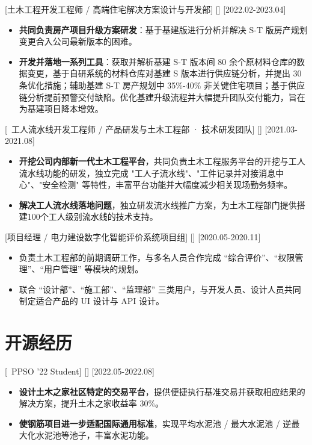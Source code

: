 \documentclass{resume}
\begin{document}
[土木工程开发工程师 / 高端住宅解决方案设计与开发部]
[]
[2022.02-2023.04]
\begin{itemize}
  \item \textbf{共同负责房产项目升级方案研发}：基于基建版进行分析并解决 S-T 版房产规划变更合入公司最新版本的困难。
  \item \textbf{开发并落地一系列工具}：获取并解析基建 S-T 版本间 80 余个原材料仓库的数据变更，基于自研系统的材料仓库对基建 S 版本进行供应链分析，并提出 30 条优化措施；辅助基建 S-T 房产规划中 35\%-40\% 非关键住宅项目；基于供应链分析提前预警交付缺陷。优化基建升级流程并大幅提升团队交付能力，旨在为基建项目降本增效。
\end{itemize}

[\ 工人流水线开发工程师 / 产品研发与土木工程部 · 技术研发团队]
[]
[2021.03-2021.08]
\begin{itemize}
  \item \textbf{开挖公司内部新一代土木工程平台}，共同负责土木工程服务平台的开挖与工人流水线功能的研发，独立完成 "工人子流水线"、"工件记录并对接消息中心"、"安全检测" 等特性，丰富平台功能并大幅度减少相关现场勤务频率。
  \item \textbf{解决工人流水线落地问题}，独立研发流水线推广方案，为土木工程部门提供搭建100个工人级别流水线的技术支持。
\end{itemize}

[项目经理 / 电力建设数字化智能评价系统项目组]
[]
[2020.05-2020.11]
\begin{itemize}
  \item 负责土木工程部的前期调研工作，与多名人员合作完成 “综合评价”、“权限管理”、“用户管理” 等模块的规划。
  \item 联合 “设计部”、“施工部”、“监理部” 三类用户，与开发人员、设计人员共同制定适合产品的 UI 设计与 API 设计。
\end{itemize}


\section{开源经历}

[\ PPSO '22 Student]
[]
[2022.05-2022.08]
\begin{itemize}
  \item \textbf{设计土木之家社区特定的交易平台}，提供便捷执行基准交易并获取相应结果的解决方案，提升土木之家收益率 30\%。
  \item \textbf{使钢筋项目进一步适配国际通用标准}，实现平均水泥池 / 最大水泥池 / 逆最大化水泥池等池子，丰富水泥功能。
\end{itemize}
\end{document}
